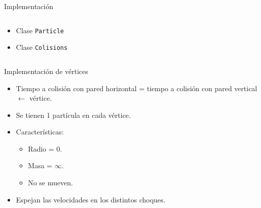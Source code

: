 \documentclass{beamer}
\begin{document}
\begin{frame}{Implementación}
\begin{columns}
\begin{column}{0.6\textwidth}
{\begin{itemize}
          \item Clase \texttt{Particle}
          \item Clase \texttt{Colisions}
        \end{itemize}
      }
    \end{column}
  \end{columns}
\end{frame}


\begin{frame}{Implementación de vértices}
  \begin{itemize}
    \item Tiempo a colisión con pared horizontal = tiempo a colisión con pared vertical $\leftarrow$ vértice.
    \item Se tienen 1 partícula en cada vértice.
    \item Características:
      \begin{itemize}
        \item Radio = 0.
        \item Masa = $\infty$.
        \item No se mueven.
      \end{itemize}
    \item Espejan las velocidades en los distintos choques.
  \end{itemize}
\end{frame}

\end{document}
